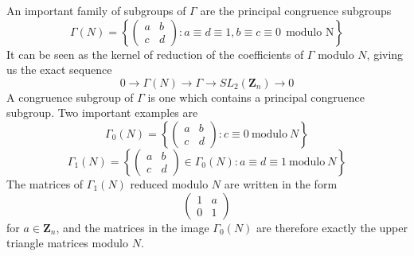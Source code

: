 An important family of subgroups of $\Gamma$ are the principal congruence subgroups
%
\[ \Gamma(N) = \left\{ \begin{pmatrix} a & b \\ c & d \end{pmatrix} : a \equiv d \equiv 1, b \equiv c \equiv 0\ \ \text{modulo N} \right\} \]
%
It can be seen as the kernel of reduction of the coefficients of $\Gamma$ modulo $N$, giving us the exact sequence
%
\[ 0 \to \Gamma(N) \to \Gamma \to SL_2(\mathbf{Z}_n) \to 0 \]
%
A congruence subgroup of $\Gamma$ is one which contains a principal congruence subgroup. Two important examples are
%
\[ \Gamma_0(N) = \left\{ \begin{pmatrix} a & b \\ c & d \end{pmatrix} : c \equiv 0\ \text{modulo}\ N \right\} \]
\[ \Gamma_1(N) = \left\{ \begin{pmatrix} a & b \\ c & d \end{pmatrix} \in \Gamma_0(N) : a \equiv d \equiv 1\ \text{modulo}\ N \right\} \]
%
The matrices of $\Gamma_1(N)$ reduced modulo $N$ are written in the form
%
\[ \begin{pmatrix} 1 & a \\ 0 & 1 \end{pmatrix} \]
%
for $a \in \mathbf{Z}_n$, and the matrices in the image $\Gamma_0(N)$ are therefore exactly the upper triangle matrices modulo $N$.

